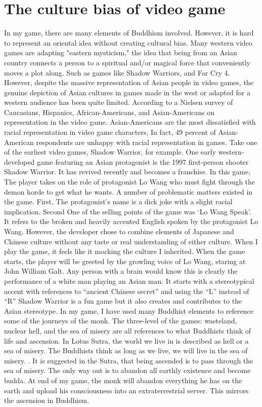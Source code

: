 \documentclass[10pt,twocolumn]{article}
\begin{document}
\section{The culture bias of video game  }
In my game, there are many elements of Buddhism involved. However, it is hard to represent an oriental idea without creating cultural bias. Many western video games are adapting "eastern mysticism," the idea that being from an Asian country connects a person to a spiritual and/or magical force that conveniently moves a plot along. Such as games like Shadow Warriors, and Far Cry 4.  However, despite the massive representation of Asian people in video games, the genuine depiction of Asian cultures in games made in the west or adapted for a western audience has been quite limited. 
According to a Nielsen survey of Caucasians, Hispanics, African-Americans, and Asian-Americans on representation in the video game. Asian-Americans are the most dissatisfied with racial representation in video game characters, In fact, 49 percent of Asian-American respondents are unhappy with racial representation in games. \cite{a2015_how}Take one of the earliest video games, Shadow Warrior, for example. 
One early western-developed game featuring an Asian protagonist is the 1997 first-person shooter Shadow Warrior. It has revived recently and becomes a franchise. In this game, The player takes on the role of protagonist Lo Wang who must fight through the demon horde to get what he wants. 
A number of problematic matters existed in the game. First, The protagonist’s name is a dick joke with a slight racial implication. Second One of the selling points of the game was  ‘Lo Wang Speak’. It refers to the broken and heavily accented English spoken by the protagonist Lo Wang.  However, the developer chose to combine elements of Japanese and Chinese culture without any taste or real understanding of either culture. When I play the game, it feels like it mocking the culture I inherited. When the game starts, the player will be greeted by the growling voice of Lo Wang, staring at John William Galt. Any person with a brain would know this is clearly the performance of a white man playing an Asian man. It starts with a stereotypical accent with references to “ancient Chinese secret” and using the “L” instead of “R” Shadow Warrior is a fun game but it also creates and contributes to the Asian stereotype. 
In my game, I have used many Buddhist elements to reference some of the journeys of the monk. The three-level of the games: wasteland, nuclear hell, and the sea of misery are all 
 references to what Buddhists think of life and ascension. In Lotus Sutra, the world we live in is described as hell or a sea of misery. The Buddhists think as long as we live, we will live in the sea of misery. . It is suggested in the Sutra, that being ascended is to pass through the sea of misery. The only way out is to abandon all earthly existence and become budda. At end of my game, the monk will abandon everything he has on the earth and upload his consciousness into an extraterrestrial server. This mirrors the ascension in Buddhism.
\end{document}
